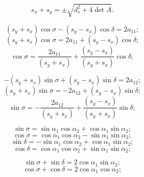 $$s_x + s_y = \pm \sqrt{d_s^2 + 4 \det A}.$$
	
$$ (s_y + s_x) \cos{\sigma} - (s_y - s_x)\cos{\delta} = 2 a_{11};$$
$$ (s_y + s_x) \cos{\sigma} = 2 a_{11} + (s_y - s_x)\cos{\delta};$$
$$\cos{\sigma} = \frac{2 a_{11}}{(s_y + s_x)} + \frac{(s_y - s_x)}{(s_y + s_x)}\cos{\delta};$$

$$-(s_y + s_x) \sin{\sigma} + (s_y - s_x)\sin{\delta} = 2 a_{12};$$
$$(s_y + s_x) \sin{\sigma} = - 2 a_{12} + (s_y - s_x)\sin{\delta};$$
$$\sin{\sigma} = - \frac{2 a_{12}}{(s_y + s_x)} + \frac{(s_y - s_x)}{(s_y + s_x)}\sin{\delta};$$

$$\sin\sigma = \sin\alpha_1 \cos\alpha_2 + \cos\alpha_1 \sin\alpha_2;$$
$$\cos\sigma = \cos\alpha_1 \cos\alpha_2 - \sin\alpha_1 \sin\alpha_2;$$
$$\sin\delta = - \sin\alpha_1 \cos\alpha_2 + \cos\alpha_1 \sin\alpha_2;$$
$$\cos\delta =\cos\alpha_1 \cos\alpha_2 + \sin\alpha_1 \sin\alpha_2;$$

$$\sin\sigma + \sin\delta = 2\cos\alpha_1 \sin\alpha_2;$$
$$\cos\sigma + \cos\delta = 2\cos\alpha_1 \cos\alpha_2;$$
